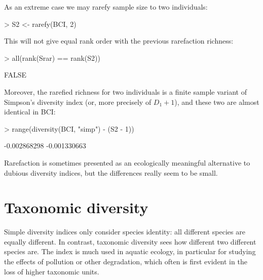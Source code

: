 \documentclass[a4paper,10pt]{amsart}
\begin{document}
As an extreme case we may rarefy sample size to two individuals:
\begin{Schunk}
\begin{Sinput}
> S2 <- rarefy(BCI, 2)
\end{Sinput}
\end{Schunk}
This will not give equal rank order with the previous rarefaction
richness:
\begin{Schunk}
\begin{Sinput}
> all(rank(Srar) == rank(S2))
\end{Sinput}
\begin{Soutput}
[1] FALSE
\end{Soutput}
\end{Schunk}
Moreover, the rarefied richness for two individuals is a finite
sample variant of Simpson's diversity index (or, more precisely of
$D_1 + 1$), and these two are almost identical in BCI:
\begin{Schunk}
\begin{Sinput}
> range(diversity(BCI, "simp") - (S2 - 1))
\end{Sinput}
\begin{Soutput}
[1] -0.002868298 -0.001330663
\end{Soutput}
\end{Schunk}
Rarefaction is sometimes presented as an ecologically meaningful
alternative to dubious diversity indices, but the differences really
seem to be small.

\section{Taxonomic diversity}

Simple diversity indices only consider species identity: all different
species are equally different. In contrast, taxonomic diversity sees
how different two different species are. The index is much used in
aquatic ecology, in particular for studying the effects of pollution
or other degradation, which often is first evident in the loss of
higher taxonomic units.
\end{document}
